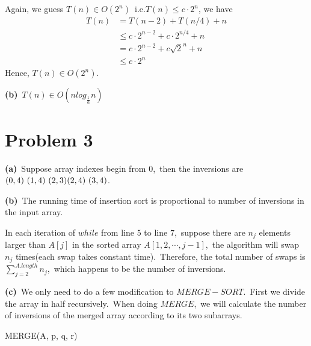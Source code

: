 \documentclass[]{article}
\begin{document}
	Again, we guess $T(n)\in O(2^n)$\ i.e.$T(n)\leq c\cdot 2^n$, we have
	\begin{equation*}
	\begin{aligned}
	T(n) &= T(n - 2) + T(n / 4) + n\\
	&\leq c\cdot 2^{n - 2} + c\cdot 2^{n / 4} + n\\
	&= c\cdot 2^{n - 2} + c\sqrt{2}^n + n\\
	&\leq c\cdot 2^n
	\end{aligned}
	\end{equation*}
	Hence, $T(n)\in O(2^n)$.
	
	\textbf{(b)}\ $T(n)\in O(nlog_{\frac{1}{\alpha}}n)$
	
	\section{Problem 3}
	\textbf{(a)}\ Suppose array indexes begin from $0$,\ then the inversions are $(0,4)\ (1,4)\ (2,3)\\(2,4)\ (3,4)$.
	
	\textbf{(b)}\ The running time of insertion sort is proportional to number of inversions in the input array.
	
	In each iteration of $while$ from line $5$ to line $7$,\ suppose there are $n_j$ elements larger than $A[j]$ in the sorted array $A[1,2,\cdots,j-1]$,\ the algorithm will swap $n_j$ times(each swap takes constant time).\ Therefore, the total number of swaps is $\sum_{j=2}^{A.length}n_j$,\ which happens to be the number of inversions.
	
	\textbf{(c)}\ We only need to do a few modification to $MERGE-SORT$.\ First we divide the array in half recursively.\ When doing $MERGE$,\ we will calculate the number of inversions of the merged array according to its two subarrays.

	\begin{algorithm}[H]
		\caption{MERGE(A, p, q, r)} %
		\begin{algorithmic}[1]
			\EndFor
			\EndFor
			\Else
			\EndIf
			\EndFor
		\end{algorithmic}
	\end{algorithm}
\end{document}

